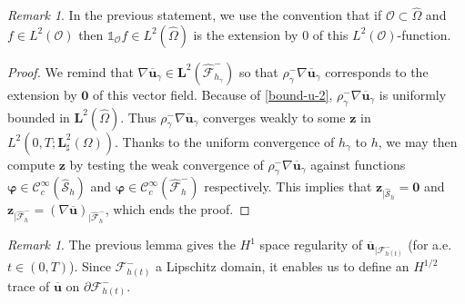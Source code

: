 \documentclass[10pt]{amsart}
\let\mathcal\mathscr
\theoremstyle{remark}
\newtheorem{remark}[theorem]{Remark}
\theoremstyle{definition}
\newcommand{\ug}{\boldsymbol{u}}
\newcommand{\BS}[1]{\boldsymbol{#1}}
\let\CM\Omega
\begin{document}
\begin{remark}
In the previous statement, we use the convention that if $\mathcal O \subset \widehat{\Omega}$ and $f \in L^2(\mathcal O)$ then $\mathds{1}_{\mathcal O} f \in L^2(\widehat{\Omega})$ is the extension by $0$ of this $L^2(\mathcal O)$-function.
\end{remark}
\begin{proof}
We remind that $\nabla \overline{\ug}_{\gamma} \in \BS{L}^2(\widehat{\mathcal F}^{-}_{h_{\gamma}})$ so that $\rho_\gamma^-\nabla \overline{\ug}_{\gamma}$ corresponds to the extension by $\BS{0}$ of this vector field. Because of \eqref{bound-u-2}, $\rho_\gamma^-\nabla \overline{\ug}_{\gamma}$ is uniformly bounded in $\BS{L}^{2}(\widehat{\Omega})$. Thus $\rho^-_\gamma \nabla \overline{\ug}_{\gamma}$ converges weakly to some $\BS{z}$ in $L^{2}(0,T;\BS{L}_\sharp^{2}(\CM))$. Thanks to the uniform convergence of $h_{\gamma}$ to $h$, we may then compute $\BS{z}$ by testing
the weak convergence of $\rho^-_\gamma \nabla \overline{\ug}_{\gamma}$ against
functions $\BS{\varphi} \in \mathcal C^{\infty}_c(\widehat{\mathcal S}_h)$ and
$\BS{\varphi} \in \mathcal C^{\infty}_c(\widehat{\mathcal F}_h^{-})$ respectively. This implies that $\BS{z}_{\vert\widehat{\mathcal{S}}_h}=\BS{0}$ and
$\BS{z}_{\vert\widehat{\mathcal{F}}^-_{h}}=(\nabla \overline{\ug})_{\vert\widehat{\mathcal{F}}^-_{h}}$, which ends the proof.
\end{proof}

\begin{remark}
The previous lemma gives the $H^1$ space regularity of $\overline{\ug}_{|{\mathcal{F}^-_{h(t)}}}$ (for a.e. $t \in (0,T)$). Since $\mathcal{F}^-_{h(t)}$ a Lipschitz domain, it enables us to define an $H^{1/2}$ trace of $\overline{\ug}$ on ${\partial \mathcal F^-_{h(t)}}$.
\end{remark}
\end{document}
